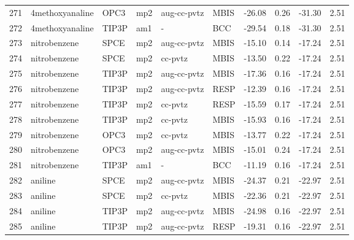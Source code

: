 \begin{tabular}{llllllrrrr}
271 &                4methoxyanaline &       OPC3 &      mp2 &  aug-cc-pvtz &         MBIS & -26.08 &      0.26 &      -31.30 &     2.51 \\
272 &                4methoxyanaline &      TIP3P &      am1 &            - &          BCC & -29.54 &      0.18 &      -31.30 &     2.51 \\
273 &                   nitrobenzene &       SPCE &      mp2 &  aug-cc-pvtz &         MBIS & -15.10 &      0.14 &      -17.24 &     2.51 \\
274 &                   nitrobenzene &       SPCE &      mp2 &      cc-pvtz &         MBIS & -13.50 &      0.22 &      -17.24 &     2.51 \\
275 &                   nitrobenzene &      TIP3P &      mp2 &  aug-cc-pvtz &         MBIS & -17.36 &      0.16 &      -17.24 &     2.51 \\
276 &                   nitrobenzene &      TIP3P &      mp2 &  aug-cc-pvtz &         RESP & -12.39 &      0.16 &      -17.24 &     2.51 \\
277 &                   nitrobenzene &      TIP3P &      mp2 &      cc-pvtz &         RESP & -15.59 &      0.17 &      -17.24 &     2.51 \\
278 &                   nitrobenzene &      TIP3P &      mp2 &      cc-pvtz &         MBIS & -15.93 &      0.16 &      -17.24 &     2.51 \\
279 &                   nitrobenzene &       OPC3 &      mp2 &      cc-pvtz &         MBIS & -13.77 &      0.22 &      -17.24 &     2.51 \\
280 &                   nitrobenzene &       OPC3 &      mp2 &  aug-cc-pvtz &         MBIS & -15.01 &      0.24 &      -17.24 &     2.51 \\
281 &                   nitrobenzene &      TIP3P &      am1 &            - &          BCC & -11.19 &      0.16 &      -17.24 &     2.51 \\
282 &                        aniline &       SPCE &      mp2 &  aug-cc-pvtz &         MBIS & -24.37 &      0.21 &      -22.97 &     2.51 \\
283 &                        aniline &       SPCE &      mp2 &      cc-pvtz &         MBIS & -22.36 &      0.21 &      -22.97 &     2.51 \\
284 &                        aniline &      TIP3P &      mp2 &  aug-cc-pvtz &         MBIS & -24.98 &      0.16 &      -22.97 &     2.51 \\
285 &                        aniline &      TIP3P &      mp2 &  aug-cc-pvtz &         RESP & -19.31 &      0.16 &      -22.97 &     2.51 \\

\end{tabular}
